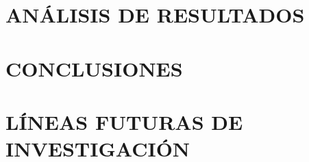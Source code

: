 \documentclass[12pt]{article}
\begin{document}
\newpage
\section{ANÁLISIS DE RESULTADOS} 
    

\newpage
\section{CONCLUSIONES} 
    

\newpage
\section{LÍNEAS FUTURAS DE INVESTIGACIÓN} 
    

\newpage

% 
\printbibliography[title={Bibliografia}]

%     
\end{document}
